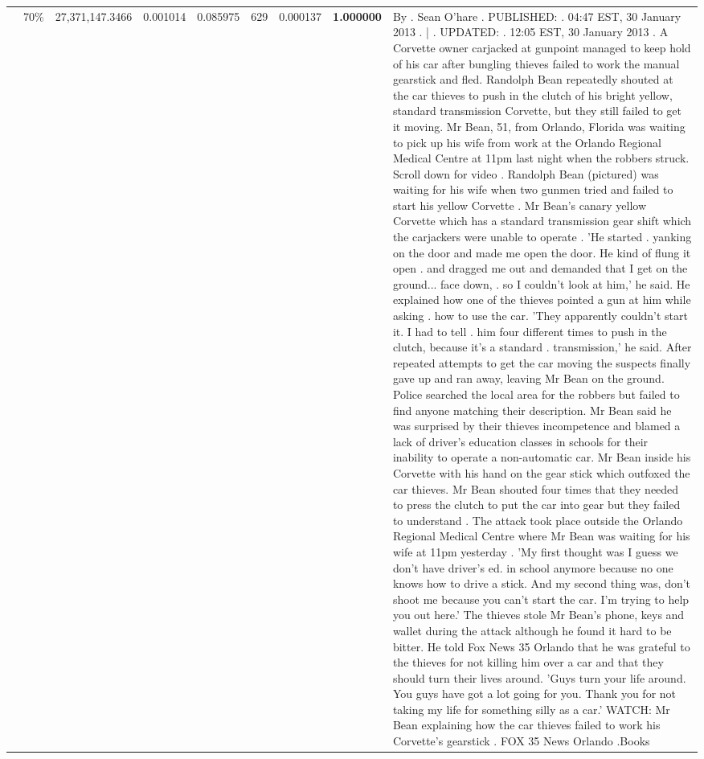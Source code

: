 \begin{table}[H]
\begin{tabular}{llrrrrrrl}
 & 70\% & 27,371,147.3466 & 0.001014 & 0.085975 & \color{red} 629 & 0.000137 & \bfseries \color{red} 1.000000 & By . Sean O'hare . PUBLISHED: . 04:47 EST, 30 January 2013 . | . UPDATED: . 12:05 EST, 30 January 2013 . A Corvette owner carjacked at gunpoint managed to keep hold of his car after bungling thieves failed to work the manual gearstick and fled. Randolph Bean repeatedly shouted at the car thieves to push in the clutch of his bright yellow, standard transmission Corvette, but they still failed to get it moving. Mr Bean, 51, from Orlando, Florida was waiting to pick up his wife from work at the Orlando Regional Medical Centre at 11pm last night when the robbers struck. Scroll down for video . Randolph Bean (pictured) was waiting for his wife when two gunmen tried and failed to start his yellow Corvette . Mr Bean's canary yellow Corvette which has a standard transmission gear shift which the carjackers were unable to operate . 'He started . yanking on the door and made me open the door. He kind of flung it open . and dragged me out and demanded that I get on the ground... face down, . so I couldn't look at him,' he said. He explained how one of the thieves pointed a gun at him while asking . how to use the car. 'They apparently couldn't start it. I had to tell . him four different times to push in the clutch, because it's a standard . transmission,' he said. After repeated attempts to get the car moving the suspects finally gave up and ran away, leaving Mr Bean on the ground. Police searched the local area for the robbers but failed to find anyone matching their description. Mr Bean said he was surprised by their thieves incompetence and blamed a lack of driver's education classes in schools for their inability to operate a non-automatic car. Mr Bean inside his Corvette with his hand on the gear stick which outfoxed the car thieves. Mr Bean shouted four times that they needed to press the clutch to put the car into gear but they failed to understand . The attack took place outside the Orlando Regional Medical Centre where Mr Bean was waiting for his wife at 11pm yesterday . 'My first thought was I guess we don't have driver's ed. in school anymore because no one knows how to drive a stick. And my second thing was, don't shoot me because you can't start the car. I'm trying to help you out here.' The thieves stole Mr Bean's phone, keys and wallet during the attack although he found it hard to be bitter. He told Fox News 35 Orlando that he was grateful to the thieves for not killing him over a car and that they should turn their lives around. 'Guys turn your life around. You guys have got a lot going for you. Thank you for not taking my life for something silly as a car.' WATCH: Mr Bean explaining how the car thieves failed to work his Corvette's gearstick . FOX 35 News Orlando .Books \\

\end{tabular}
\end{table}
